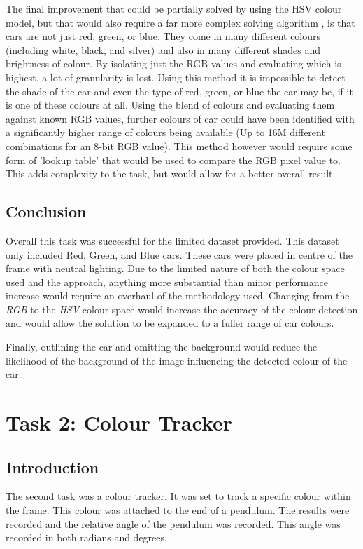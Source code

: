 \documentclass[conference]{IEEEtran}
\begin{document}
The final improvement that could be partially solved by using the HSV colour model, but that would also require a far more complex solving algorithm \cite{ref:colour_sorting}, is that cars are not just red, green, or blue. They come in many different colours (including white, black, and silver) and also in many different shades and brightness of colour. By isolating just the RGB values and evaluating which is highest, a lot of granularity is lost. Using this method it is impossible to detect the shade of the car and even the type of red, green, or blue the car may be, if it is one of these colours at all. Using the blend of colours and evaluating them against known RGB values, further colours of car could have been identified with a significantly higher range of colours being available (Up to 16M different combinations for an 8-bit RGB value). This method however would require some form of 'lookup table' that would be used to compare the RGB pixel value to. This adds complexity to the task, but would allow for a better overall result.

\subsection{Conclusion}

Overall this task was successful for the limited dataset provided. This dataset only included Red, Green, and Blue cars. These cars were placed in centre of the frame with neutral lighting. Due to the limited nature of both the colour space used and the approach, anything more substantial than minor performance increase would require an overhaul of the methodology used. Changing from the \textit{RGB} to the \textit{HSV} colour space would increase the accuracy of the colour detection and would allow the solution to be expanded to a fuller range of car colours. 

Finally, outlining the car and omitting the background would reduce the likelihood of the background of the image influencing the detected colour of the car.

\section{Task 2: Colour Tracker}

\subsection{Introduction}

The second task was a colour tracker. It was set to track a specific colour within the frame. This colour was attached to the end of a pendulum. The results were recorded and the relative angle of the pendulum was recorded. This angle was recorded in both radians and degrees. 
\end{document}
